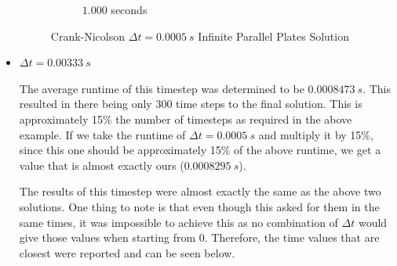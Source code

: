 \documentclass[addpoints]{exam}
\newcommand{\Dt}{\Delta t}
\begin{document}
\begin{questions}
\begin{parts}
\begin{solution}
\begin{itemize}
\begin{figure}[H]
\begin{subfigure}{.5\textwidth}
  \caption{$1.000$ seconds}
  \label{fig:1.0_CN1}
\end{subfigure}
\caption{Crank-Nicolson $\Dt = 0.0005\ s$ Infinite Parallel Plates Solution}
\label{fig:CN1}
\end{figure}

\item $\Dt = 0.00333\ s$

The average runtime of this timestep was determined to be $0.0008473\ s$. This resulted in there being only $300$ time steps to the final solution. This is approximately 15\% the number of timesteps as required in the above example. If we take the runtime of $\Dt = 0.0005\ s$ and multiply it by 15\%, since this one should be approximately 15\% of the above runtime, we get a value that is almost exactly ours ($0.0008295\ s$). 

The results of this timestep were almost exactly the same as the above two solutions. One thing to note is that even though this asked for them in the same times, it was impossible to achieve this as no combination of $\Dt$ would give those values when starting from 0. Therefore, the time values that are closest were reported and can be seen below.


\end{itemize}
\end{solution}
\end{parts}
\end{questions}
\end{document}
